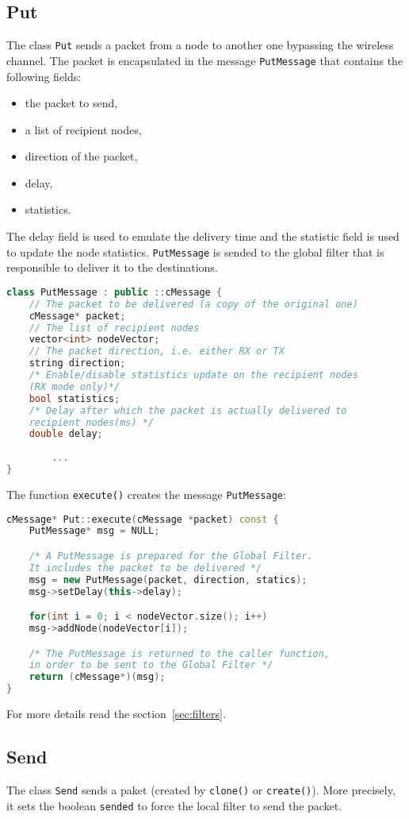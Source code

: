 \subsection{Put}
The class \texttt{Put} sends a packet from a node to another one bypassing the wireless channel. The packet is encapsulated in the message \texttt{PutMessage} that contains the following fields:
%
\begin{itemize}
\item the packet to send,
\item a list of recipient nodes,
\item direction of the packet,
\item delay,
\item statistics.
\end{itemize}
%
The delay field is used to emulate the delivery time and the statistic field is used to update the node statistics. \texttt{PutMessage} is sended to the global filter that is responsible to deliver it to the destinations. 
%
\begin{lstlisting}[language={cpp}]
class PutMessage : public ::cMessage {
	// The packet to be delivered (a copy of the original one)
	cMessage* packet; 
	// The list of recipient nodes
	vector<int> nodeVector;
	// The packet direction, i.e. either RX or TX
	string direction;
	/* Enable/disable statistics update on the recipient nodes 
	(RX mode only)*/
	bool statistics;		
	/* Delay after which the packet is actually delivered to 
	recipient nodes(ms) */
	double delay;
    
     	...
}
\end{lstlisting}
%
The function \texttt{execute()} creates the message \texttt{PutMessage}:
%
\begin{lstlisting}[language={cpp}]
cMessage* Put::execute(cMessage *packet) const {
	PutMessage* msg = NULL;

	/* A PutMessage is prepared for the Global Filter. 
	It includes the packet to be delivered */
	msg = new PutMessage(packet, direction, statics);
	msg->setDelay(this->delay);

	for(int i = 0; i < nodeVector.size(); i++)
	msg->addNode(nodeVector[i]);

	/* The PutMessage is returned to the caller function, 
	in order to be sent to the Global Filter */
	return (cMessage*)(msg);	
}
\end{lstlisting}
%
For more details read the section~\ref{sec:filters}.

\subsection{Send}
The class \texttt{Send} sends a paket (created by \texttt{clone()} or \texttt{create()}). More precisely, it sets the boolean \texttt{sended} to force the local filter to send the packet.

